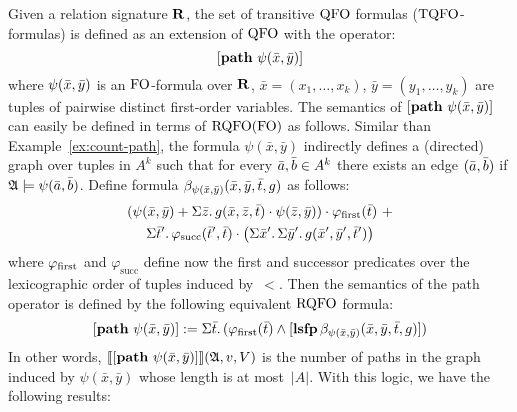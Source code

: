 Given a relation signature $\mathbf{R}$, the set of transitive ${\rm QFO}$ formulas (${\rm TQFO}$-formulas) is defined as an extension of ${\rm QFO}$ with the operator:
\[
[{\bf path} \,\, \psi(\bar{x},\bar{y})]
\]
where $\psi(\bar{x}, \bar{y})$ is an ${\rm FO}$-formula over $\mathbf{R}$, $\bar{x} = (x_1, \ldots, x_k)$, $\bar{y} = (y_1, \ldots, y_k)$ are tuples of pairwise distinct first-order variables. The semantics of $[{\bf path} \,\, \psi(\bar{x},\bar{y})]$ can easily be defined in terms of ${\rm RQFO}({\rm FO})$ as follows. 
Similar than Example~\ref{ex:count-path}, the formula $\psi(\bar{x},\bar{y})$ indirectly defines a (directed) graph over tuples in $A^k$ such that for every $\bar{a}, \bar{b} \in A^k$ there exists an edge $(\bar{a}, \bar{b})$ if $\mathfrak{A} \models \psi(\bar a, \bar b)$. 
Define formula $\beta_{\psi(\bar{x},\bar{y})}(\bar{x}, \bar{y}, \bar{t}, g)$ as follows:
\begin{multline*}
(\psi(\bar{x},\bar{y}) + \Sigma{\bar{z}}.\, g(\bar{x},\bar{z},\bar{t})\cdot \psi(\bar{z},\bar{y})) \cdot \varphi_{\text{\rm first}}(\bar{t}) \ +\\
\Sigma{\bar{t}'}.\, \varphi_{\text{succ}}(\bar{t}',\bar{t}) \cdot \left(\Sigma{\bar{x}'}.\, \Sigma{\bar{y}'}.\, g(\bar{x}',\bar{y}',\bar{t}') \right)
\end{multline*}
where $\varphi_{\text{\rm first}}$ and $\varphi_{\text{succ}}$ define now the first and successor predicates over the lexicographic order of tuples induced by~$<$.
Then the semantics of the path operator is defined by the following equivalent ${\rm RQFO}$ formula:
\[
[{\bf path} \,\, \psi(\bar{x}, \bar{y})] := \Sigma{\bar{t}}.\, (\varphi_{\text{\rm first}}(\bar{t}) \wedge [{\bf lsfp} \, \beta_{\psi(\bar{x},\bar{y})}(\bar{x},\bar{y},\bar{t},g)])
\]
In other words, ${\llbracket{}{[{\bf path} \,\, \psi(\bar{x}, \bar{y})]}\rrbracket}(\mathfrak{A},v,V)$ is the number of paths in the graph induced by $\psi(\bar{x}, \bar{y})$ whose length is at most~$|A|$.
With this logic, we have the following results:

